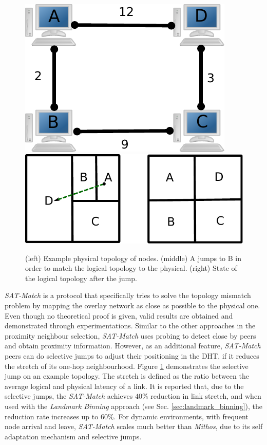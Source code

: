 \documentclass[acmcsur,acmnow]{acmtrans2m}
\begin{document}
\begin{figure}
\centering
  \includegraphics[scale=0.6]{img/algorithms/SAT_match}
  \hspace{3ex}
  \includegraphics[scale=0.6]{img/algorithms/SAT_match2}
\caption{(left) Example physical topology of nodes. (middle) A jumps to B in order to match the logical topology to the physical. (right) State of the logical topology after the jump.}
\label{fig:SAT_match}
\end{figure}

\textit{SAT-Match} \cite{ren_satmatch_2004} is a protocol that specifically
tries to solve the topology mismatch problem by mapping the overlay network as
close as possible to the physical one. Even though no theoretical proof is
given, valid results are obtained and demonstrated through experimentations.
Similar to the other approaches in the proximity neighbour selection,
\textit{SAT-Match} uses probing to detect close by peers and obtain proximity
information. However, as an additional feature, \textit{SAT-Match} peers can do
selective jumps to adjust their positioning in the DHT, if it reduces the stretch
of its one-hop neighbourhood. Figure \ref{fig:SAT_match} demonstrates the selective jump on an example topology.
The stretch is defined as the ratio between the
average logical and physical latency of a link. It is reported that, due to the
selective jumps, the \textit{SAT-Match} achieves $40\%$ reduction in link
stretch, and when used with the \textit{Landmark Binning} approach (see Sec.
\ref{sec:landmark_binning}), the reduction rate increases up to $60\%$.
For dynamic environments, with frequent node arrival and leave,
\textit{SAT-Match} scales much better than \textit{Mithos}, due to its self
adaptation mechanism and selective jumps.
\end{document}
